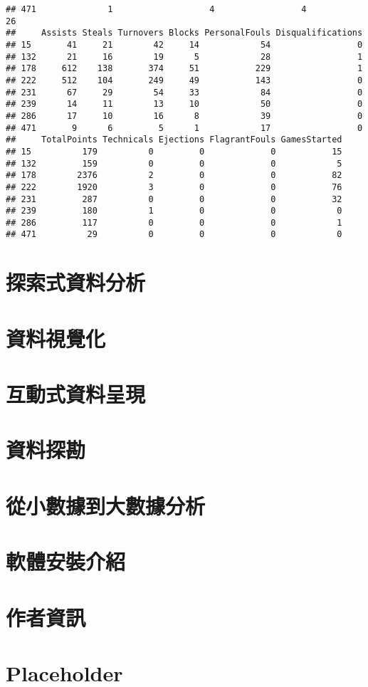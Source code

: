 \documentclass[]{book}
\begin{document}
\begin{verbatim}
## 471              1                   4                 4            26
##     Assists Steals Turnovers Blocks PersonalFouls Disqualifications
## 15       41     21        42     14            54                 0
## 132      21     16        19      5            28                 1
## 178     612    138       374     51           229                 1
## 222     512    104       249     49           143                 0
## 231      67     29        54     33            84                 0
## 239      14     11        13     10            50                 0
## 286      17     10        16      8            39                 0
## 471       9      6         5      1            17                 0
##     TotalPoints Technicals Ejections FlagrantFouls GamesStarted
## 15          179          0         0             0           15
## 132         159          0         0             0            5
## 178        2376          2         0             0           82
## 222        1920          3         0             0           76
## 231         287          0         0             0           32
## 239         180          1         0             0            0
## 286         117          0         0             0            1
## 471          29          0         0             0            0
\end{verbatim}

\chapter{探索式資料分析}\label{eda}

\chapter{資料視覺化}\label{vis}

\chapter{互動式資料呈現}\label{InteractiveGraphics}

\chapter{資料探勘}\label{datamining}

\chapter{從小數據到大數據分析}\label{big}

\chapter{軟體安裝介紹}\label{install}

\chapter*{作者資訊}\label{author}

\chapter{Placeholder}\label{placeholder}


\end{document}
